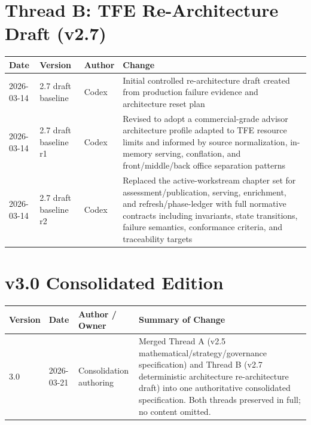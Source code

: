 \documentclass[11pt]{report}
\begin{document}
\section*{Thread B: TFE Re-Architecture Draft (v2.7)}
\begin{longtable}{|p{}|p{}|p{}|p{}|}
\hline
Date & Version & Author & Change \\\hline
2026-03-14 & 2.7 draft baseline & Codex & Initial controlled re-architecture draft created from production failure evidence and architecture reset plan \\\hline
2026-03-14 & 2.7 draft baseline r1 & Codex & Revised to adopt a commercial-grade advisor architecture profile adapted to TFE resource limits and informed by source normalization, in-memory serving, conflation, and front/middle/back office separation patterns \\\hline
2026-03-14 & 2.7 draft baseline r2 & Codex & Replaced the active-workstream chapter set for assessment/publication, serving, enrichment, and refresh/phase-ledger with full normative contracts including invariants, state transitions, failure semantics, conformance criteria, and traceability targets \\\hline
\end{longtable}

\section*{v3.0 Consolidated Edition}
\begin{longtable}{p{}p{}p{}p{}}
\toprule
Version & Date & Author / Owner & Summary of Change \\
\midrule
3.0 & 2026-03-21 & Consolidation authoring & Merged Thread A (v2.5 mathematical/strategy/governance specification) and Thread B (v2.7 deterministic architecture re-architecture draft) into one authoritative consolidated specification. Both threads preserved in full; no content omitted. \\
\bottomrule
\end{longtable}
\end{document}

